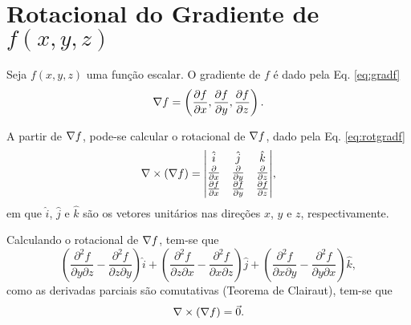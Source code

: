 \section{Rotacional do Gradiente de $f(x,y,z)$} \label{sec:ex1}
Seja $f(x,y,z)$ uma fun\c{c}\~ao escalar. O gradiente de $f$ \'e dado pela Eq. \eqref{eq:gradf}
\begin{equation}
    \label{eq:gradf}
    \nabla f = \left( \frac{\partial f}{\partial x}, \frac{\partial f}{\partial y}, \frac{\partial f}{\partial z} \right).
\end{equation}

A partir de $\nabla f$, pode-se calcular o rotacional de $\nabla f$, dado pela Eq. \eqref{eq:rotgradf}
\begin{equation}
    \label{eq:rotgradf}
    \nabla \times (\nabla f) = 
    \begin{matrix}
        \begin{vmatrix}
            \hat{i} & \hat{j} & \hat{k} \\
            \frac{\partial}{\partial x} & \frac{\partial}{\partial y} & \frac{\partial}{\partial z} \\
            \frac{\partial f}{\partial x} & \frac{\partial f}{\partial y} & \frac{\partial f}{\partial z}
        \end{vmatrix}
    \end{matrix},        
\end{equation}
em que $\hat{i}$, $\hat{j}$ e $\hat{k}$ s\~ao os vetores unit\'arios nas dire\c{c}\~oes $x$, $y$ e $z$, respectivamente.

Calculando o rotacional de $\nabla f$, tem-se que
\begin{equation*}
    \left( \frac{\partial^2 f}{\partial y \partial z} - \frac{\partial^2 f}{\partial z \partial y} \right) \hat{i} + 
        \left( \frac{\partial^2 f}{\partial z \partial x} - \frac{\partial^2 f}{\partial x \partial z} \right) \hat{j} + 
        \left( \frac{\partial^2 f}{\partial x \partial y} - \frac{\partial^2 f}{\partial y \partial x} \right) \hat{k},
\end{equation*}
como as derivadas parciais s\~ao comutativas (Teorema de Clairaut), tem-se que
\begin{equation*}
    \nabla \times (\nabla f) = \vec{0}.
\end{equation*}



